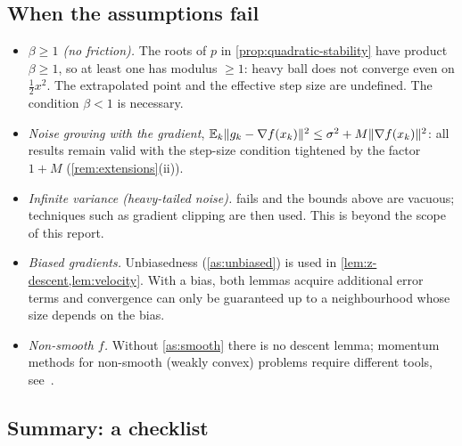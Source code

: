 \subsection{When the assumptions fail}

\begin{itemize}
\item \emph{$\beta\ge1$ (no friction).} The roots of $p$ in \cref{prop:quadratic-stability}
  have product $\beta\ge1$, so at least one has modulus $\ge1$: heavy ball does not converge
  even on $\frac12x^2$. The extrapolated point and the effective step size are undefined.
  The condition $\beta<1$ is necessary.
\item \emph{Noise growing with the gradient},
  $\mathbb{E}_k\lVert g_k-\nabla f(x_k)\rVert^2\le\sigma^2+M\lVert \nabla f(x_k)\rVert^2$: all results remain
  valid with the step-size condition tightened by the factor $1+M$
  (\cref{rem:extensions}(ii)).
\item \emph{Infinite variance (heavy-tailed noise).}  fails and the bounds
  above are vacuous; techniques such as gradient clipping are then used. This is beyond the
  scope of this report.
\item \emph{Biased gradients.} Unbiasedness (\cref{as:unbiased}) is used in
  \cref{lem:z-descent,lem:velocity}. With a bias, both lemmas acquire additional error
  terms and convergence can only be guaranteed up to a neighbourhood whose size depends on
  the bias.
\item \emph{Non-smooth $f$.} Without \cref{as:smooth} there is no descent lemma; momentum
  methods for non-smooth (weakly convex) problems require different tools,
  see~\cite{mai2020}.
\end{itemize}

\subsection{Summary: a checklist}

